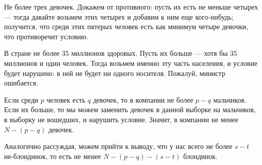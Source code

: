 ﻿
\begin{itemize}
\itA Не более трех девочек. Докажем от противного: пусть их есть не меньше четырех --- 
тогда давайте возьмем этих четырех и добавим к ним еще кого-нибудь; получится, что  
среди этих пятерых человек есть как минимум четыре девочки, что противоречит условию.

\itB В стране не более 35 миллионов здоровых. Пусть их больше --- хотя бы 35 миллионов и один 
человек. Тогда возьмем именно эту часть населения, и условие будет нарушено: в ней
не будет ни одного носителя. Пожалуй, министр ошибается.

\itC Если среди $p$ человек есть $q$ девочек, то в компании не более $p-q$ мальчиков. 
Если их больше, то мы можем заменить девочек в данной выборке на мальчиков, в выборку
не вошедших, и нарушить условие. Значит, в компании не менее $N-(p-q)$ девочек.

Аналогично рассуждая, можем прийти к выводу, что у нас всего не более $s-t$ не-блондинок, 
то есть не менее $N-(p-q)-(s-t)$ блондинок.
\end{itemize}
